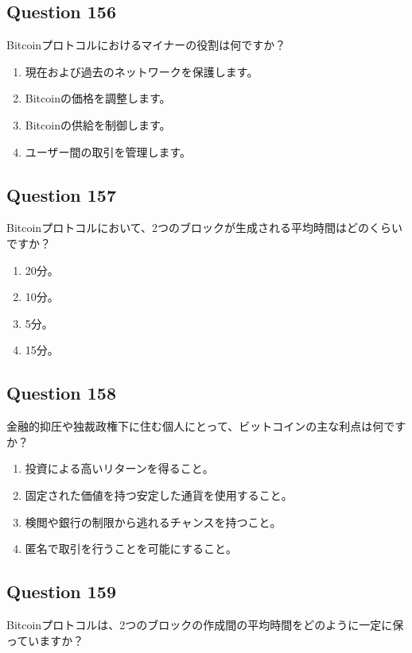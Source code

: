 \documentclass[12pt,a4paper]{article}
\begin{document}
\bigskip


\subsection*{Question 156}
Bitcoinプロトコルにおけるマイナーの役割は何ですか？

\begin{enumerate}[label=\Alph*., leftmargin=*]
\item 現在および過去のネットワークを保護します。
\item Bitcoinの価格を調整します。
\item Bitcoinの供給を制御します。
\item ユーザー間の取引を管理します。
\end{enumerate}

\bigskip


\subsection*{Question 157}
Bitcoinプロトコルにおいて、2つのブロックが生成される平均時間はどのくらいですか？

\begin{enumerate}[label=\Alph*., leftmargin=*]
\item 20分。
\item 10分。
\item 5分。
\item 15分。
\end{enumerate}

\bigskip


\subsection*{Question 158}
金融的抑圧や独裁政権下に住む個人にとって、ビットコインの主な利点は何ですか？

\begin{enumerate}[label=\Alph*., leftmargin=*]
\item 投資による高いリターンを得ること。
\item 固定された価値を持つ安定した通貨を使用すること。
\item 検閲や銀行の制限から逃れるチャンスを持つこと。
\item 匿名で取引を行うことを可能にすること。
\end{enumerate}

\bigskip


\subsection*{Question 159}
Bitcoinプロトコルは、2つのブロックの作成間の平均時間をどのように一定に保っていますか？
\end{document}
